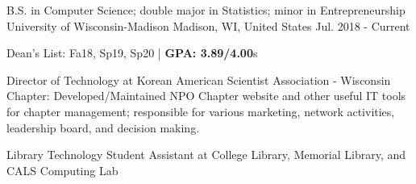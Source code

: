 

\begin{cventries}

  \cventry
  {B.S. in Computer Science; double major in Statistics; minor in Entrepreneurship} %
  {University of Wisconsin-Madison} %
  {Madison, WI, United States} %
  {Jul. 2018 - Current} %
  {
    \begin{cvitems} %
      \item {Dean's List: Fa18, Sp19, Sp20 | \textbf{GPA: 3.89/4.00}}s
      \item {Director of Technology at Korean American Scientist Association - Wisconsin Chapter: Developed/Maintained NPO Chapter website and other useful IT tools for chapter management; responsible for various marketing, network activities, leadership board, and decision making.}
      \item {Library Technology Student Assistant at College Library, Memorial Library, and CALS Computing Lab}
    \end{cvitems}
  }

\end{cventries}
